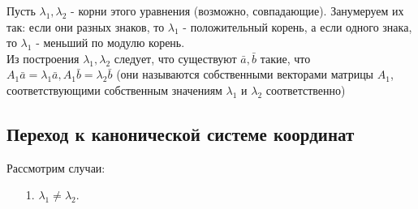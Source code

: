 \documentclass[a4paper, 12pt]{article}
\theoremstyle{definition}
\begin{document}
	Пусть $\lambda_1, \lambda_2$ - корни этого уравнения (возможно, совпадающие). Занумеруем их так: если они разных знаков, то $\lambda_1$ - положительный корень, а если одного знака, то $\lambda_1$ - меньший по модулю корень.\\
	Из построения $\lambda_1, \lambda_2$ следует, что существуют $\bar{a}, \bar{b}$ такие, что $A_1 \bar{a} = \lambda_1 \bar{a}, A_1 \bar{b} = \lambda_2 \bar{b}$ (они называются собственными векторами матрицы $A_1$, соответствующими собственным значениям $\lambda_1$ и $\lambda_2$ соответственно)
  	\subsection{Переход к канонической системе координат}
	Рассмотрим случаи: \begin{enumerate}
		\item [\LARGE 1.] {$\lambda_1 \neq \lambda_2$}.
		

\end{enumerate}
\end{document}
